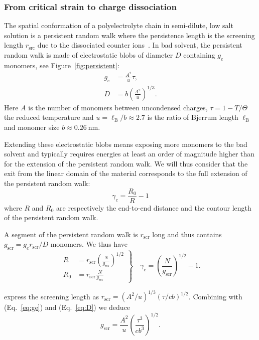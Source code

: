 \documentclass[journal=jacsat,manuscript=article]{achemso}
\begin{document}
\subsubsection{From critical strain to charge dissociation}

The spatial conformation of a polyelectrolyte chain in semi-dilute, low salt solution is a persistent random walk where the persistence length is the screening length $r_\mathrm{src}$ due to the dissociated counter ions~\cite{Rubinstein1996}. In bad solvent, the persistent random walk is made of electrostatic blobs of diameter $D$ containing $g_e$ monomers, see Figure~\ref{fig:persistent}:
\begin{align}
g_e &= \frac{A^2}{u}\tau\label{eq:ge},\\
D &= b \left(\frac{A^2}{u}\right)^{1/3}\label{eq:D}.
\end{align}
Here $A$ is the number of monomers between uncondensed charges, $\tau = 1 - T/\Theta$ the reduced temperature and $u = \ell_\mathrm{B}/b \approx 2.7$ is the ratio of Bjerrum length $\ell_\mathrm{B}$ and monomer size $b\approx \SI{0.26}{\nano\metre}$. 

Extending these electrostatic blobs means exposing more monomers to the bad solvent and typically requires energies at least an order of magnitude higher than for the extension of the persistent random walk. We will thus consider that the exit from the linear domain of the material corresponds to the full extension of the persistent random walk:
\begin{equation}
\gamma_c = \frac{R_0}{R} - 1
\end{equation}
where $R$ and $R_0$ are respectively the end-to-end distance and the contour length of the persistent random walk.

A segment of the persistent random walk is $r_\mathrm{scr}$ long and thus contains $g_\mathrm{scr} = g_e r_\mathrm{scr}/D$ monomers. We thus have
\begin{equation}
\left. \begin{array}{ll}
R &= r_\mathrm{scr} \left(\frac{N}{g_\mathrm{scr}}\right)^{1/2}\\
R_0 &= r_\mathrm{scr} \frac{N}{g_\mathrm{scr}}
\end{array}\right\rbrace\quad
\gamma_c = \left(\frac{N}{g_\mathrm{scr}}\right)^{1/2} -1\label{eq:gamma0}.
\end{equation}

\citeauthor{Rubinstein1996} express the screening length as
$r_\mathrm{scr} = \left(A^2 / u\right)^{1/3} \left(\tau /cb \right)^{1/2}$. Combining with (Eq.~\ref{eq:ge}) and (Eq.~\ref{eq:D}) we deduce
\begin{equation}
g_\mathrm{scr} = \frac{A^2}{u} \left(\frac{\tau^3}{c b^3}\right)^{1/2}\label{eq:gscr}.
\end{equation}
\end{document}

